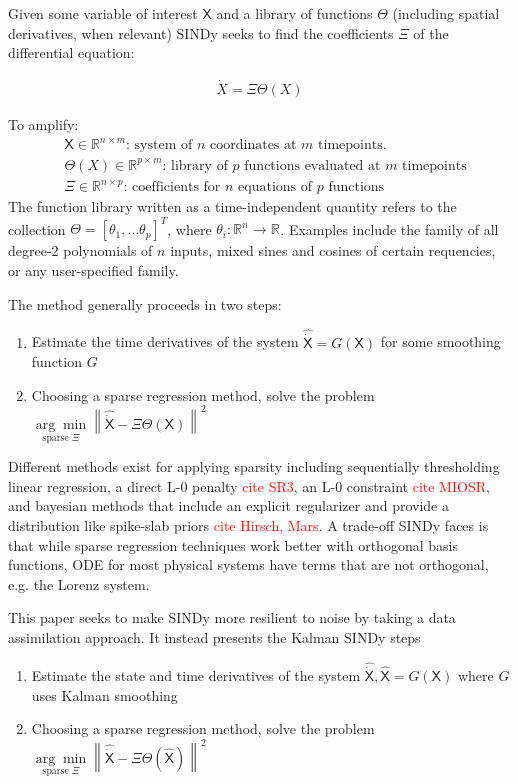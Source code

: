 \documentclass{article}
\newcommand{\red}[1]{\textcolor{red}{#1}}
\newcommand{\mat}[1]{\boldsymbol{\mathsf{#1}}}
\newcommand{\R}[1]{\mathbb{R}^{#1}}
\begin{document}
Given some variable of interest $\mat X$ and a library of functions $\mat \Theta$ (including spatial derivatives, when relevant) SINDy seeks to find the coefficients $\mat \Xi$ of the differential equation:

\begin{align}
    \label{eqn:sindy_ode}
    \dot X = \Xi\Theta(X)
\end{align}

To amplify:
\begin{align*}
    &\mat X \in \R{n \times m}\text{: system of $n$ coordinates at $m$ timepoints.}\\
    &\mat \Theta(X) \in \R{p \times m}\text{: library of $p$ functions evaluated at $m$ timepoints}\\
    &\mat \Xi \in \R{n \times p}\text{: coefficients for $n$ equations of $p$ functions}
\end{align*}
The function library written as a time-independent quantity refers to the collection $\mat \Theta = [\theta_1, \dots \theta_p]^T$, where $\theta_i: \R{n}\rightarrow\R{}$. Examples include the family of all degree-2 polynomials of $n$ inputs, mixed sines and cosines of certain requencies, or any user-specified family.

The method generally proceeds in two steps: 

\begin{enumerate}
    \item Estimate the time derivatives of the system ${\mat{\widehat{\dot X}}} = G(\mat X)$ for some smoothing function $G$
    \item Choosing a sparse regression method, solve the problem $\underset{\text{sparse } \mat \Xi}{\arg\min} \left\| \mat{\widehat{\dot{X}}} - \mat \Xi \mat \Theta(\mat X) \right\|^2$
\end{enumerate}
Different methods exist for applying sparsity including sequentially thresholding linear regression, a direct L-0 penalty \red{cite SR3}, an L-0 constraint \red{cite MIOSR}, and bayesian methods that include an explicit regularizer and provide a distribution like spike-slab priors \red{cite Hirsch, Mars}.  A trade-off SINDy faces is that while sparse regression techniques work better with orthogonal basis functions, ODE for most physical systems have terms that are not orthogonal, e.g. the Lorenz system.

This paper seeks to make SINDy more resilient to noise by taking a data assimilation approach.  It instead presents the Kalman SINDy steps
\begin{enumerate}
    \item Estimate the state and time derivatives of the system ${\mat{\widehat{\dot X}}}, \mat{\widehat X} = G(\mat X)$ where $G$ uses Kalman smoothing
    \item Choosing a sparse regression method, solve the problem $\underset{\text{sparse } \mat \Xi}{\arg\min} \left\| \mat{\widehat{\dot{X}}} - \mat \Xi \mat \Theta(\mat {\widehat X}) \right\|^2$
\end{enumerate}
\end{document}
